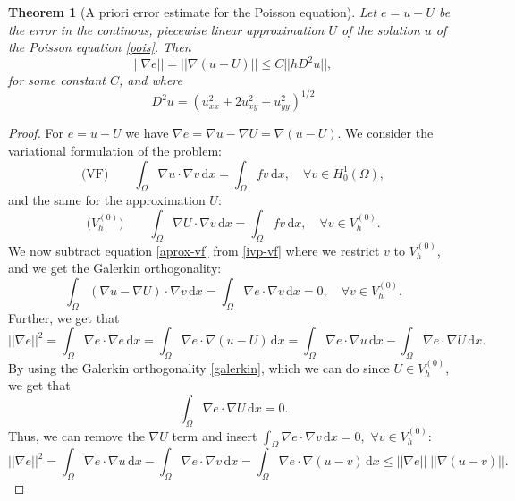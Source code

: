 \documentclass[12pt, a4paper]{article}
\newcommand{\rd}{\ensuremath{\mathrm{d}}}
\newcommand{\id}{\ensuremath{\,\rd}}
\newtheorem{theorem}{Theorem}[section]
\numberwithin{equation}{section}
\begin{document}
\begin{theorem}[A priori error estimate for the Poisson equation]
Let $e = u - U$ be the error in the continous, piecewise linear approximation $U$ of the solution $u$ of the Poisson equation \eqref{pois}. Then
\begin{equation*}
||\nabla e|| = ||\nabla(u-U)|| \leq C||hD^2u||,
\end{equation*}
for some constant $C$, and where
\begin{equation*}
D^2u = (u^2_{xx}+2u^2_{xy}+u^2_{yy})^{1/2}
\end{equation*}
\end{theorem}
\begin{proof}
For $e= u - U$ we have $\nabla e = \nabla u - \nabla U = \nabla (u-U)$. We consider the variational formulation of the problem:
\begin{equation}
\label{ivp-vf}
\text{(VF)}\quad\quad \int_\Omega \nabla u \cdot \nabla v\id x = \int_\Omega f v \id x, \quad \forall v\in H_0^1(\Omega),
\end{equation}
and the same for the approximation $U$:
\begin{equation}
\label{aprox-vf}
\text{($V_h^{(0)}$)} \quad\quad \int_\Omega \nabla U \cdot \nabla v\id x = \int_\Omega f v \id x, \quad \forall v\in V_h^{(0)}.
\end{equation}
We now subtract equation \eqref{aprox-vf} from \eqref{ivp-vf} where we restrict $v$ to $V_h^{(0)}$, and we get the Galerkin orthogonality:
\begin{equation}
\label{galerkin}
\int_\Omega (\nabla u - \nabla U) \cdot \nabla v \id x = \int_\Omega \nabla e \cdot \nabla v \id x = 0, \quad \forall v \in V_h^{(0)}.
\end{equation}
Further, we get that
\begin{equation*}
||\nabla e||^2 = \int_\Omega \nabla e \cdot \nabla e \id x = \int_\Omega \nabla e \cdot \nabla (u-U) \id x = \int_\Omega \nabla e \cdot \nabla u \id x - \int_\Omega \nabla e \cdot \nabla U \id x.
\end{equation*}
By using the Galerkin orthogonality \eqref{galerkin}, which we can do since $U\in V_h^{(0)}$, we get that
\begin{equation*}
\int_\Omega \nabla e \cdot \nabla U \id x = 0.
\end{equation*}
Thus, we can remove the $\nabla U$ term and insert $\int_\Omega \nabla e \cdot \nabla v \id x = 0,$ $\forall v\in V_h^{(0)}$:
\begin{equation*}
||\nabla e||^2 = \int_\Omega \nabla e \cdot \nabla u \id x - \int_\Omega \nabla e \cdot \nabla v \id x = \int_\Omega \nabla e \cdot \nabla (u-v) \id x \leq ||\nabla e||\;||\nabla(u-v)||.

\end{equation*}
\end{proof}
\end{document}
